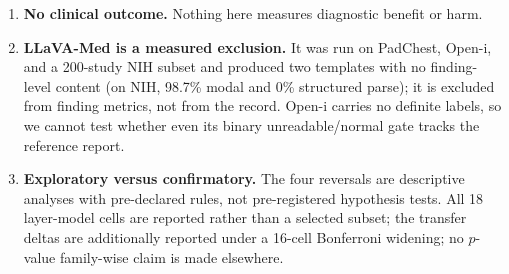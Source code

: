 \begin{enumerate}[leftmargin=1.2em,itemsep=2pt,topsep=2pt]
\item \textbf{No clinical outcome.} Nothing here measures diagnostic benefit or harm.
\item \textbf{LLaVA-Med is a measured exclusion.} It was run on PadChest, Open-i, and a 200-study NIH subset and produced two templates with no finding-level content (on NIH, 98.7\% modal and 0\% structured parse); it is excluded from finding metrics, not from the record. Open-i carries no definite labels, so we cannot test whether even its binary unreadable/normal gate tracks the reference report.
\item \textbf{Exploratory versus confirmatory.} The four reversals are descriptive analyses with pre-declared rules, not pre-registered hypothesis tests. All 18 layer-model cells are reported rather than a selected subset; the transfer deltas are additionally reported under a 16-cell Bonferroni widening; no $p$-value family-wise claim is made elsewhere.
\end{enumerate}
